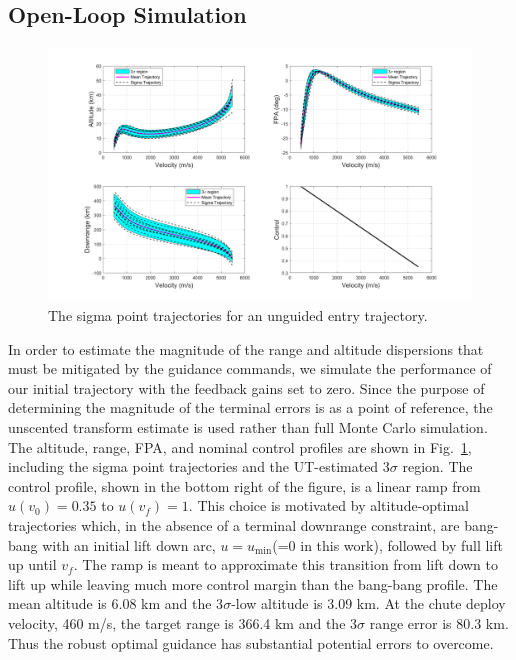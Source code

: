 \documentclass[journal ]{new-aiaa}
\begin{document}
\subsection*{Open-Loop Simulation}
\begin{figure}[h!]
	\centering
	\includegraphics[width=1\textwidth]{ddp/matlab/HeavyOpenLoopGrid}
	\caption{The sigma point trajectories for an unguided entry trajectory.}
	\label{Fig:OpenLoop}
\end{figure}
In order to estimate the magnitude of the range and altitude dispersions that must be mitigated by the guidance commands, we simulate the performance of our initial trajectory with the feedback gains set to zero. Since the purpose of determining the magnitude of the terminal errors is as a point of reference, the unscented transform estimate is used rather than full Monte Carlo simulation. The altitude, range, FPA, and nominal control profiles are shown in Fig.~\ref{Fig:OpenLoop}, including the sigma point trajectories and the UT-estimated 3$\sigma$ region. The control profile, shown in the bottom right of the figure, is a linear ramp from $u(v_0)=0.35$ to $ u(v_f)=1 $. This choice is motivated by altitude-optimal trajectories which, in the absence of a terminal downrange constraint, are bang-bang with an initial lift down arc, $u=u_{\min}$(=0 in this work), followed by full lift up until $v_f$. The ramp is meant to approximate this transition from lift down to lift up while leaving much more control margin than the bang-bang profile. 
The mean altitude is 6.08 km and the 3$\sigma$-low altitude is 3.09 km. At the chute deploy velocity, 460 m/s, the target range is 366.4 km and the 3$\sigma$ range error is $80.3$ km. Thus the robust optimal guidance has substantial potential errors to overcome. 
\end{document}
